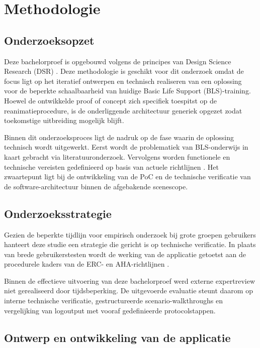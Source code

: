 \chapter{Methodologie}
\label{ch:methodologie}

\section{Onderzoeksopzet}

Deze bachelorproef is opgebouwd volgens de principes van Design Science Research (DSR) \autocite{Peffers2007,Hevner2004}. Deze methodologie is geschikt voor dit onderzoek omdat de focus ligt op het iteratief ontwerpen en technisch realiseren van een oplossing voor de beperkte schaalbaarheid van huidige Basic Life Support (BLS)-training. Hoewel de ontwikkelde proof of concept zich specifiek toespitst op de reanimatieprocedure, is de onderliggende architectuur generiek opgezet zodat toekomstige uitbreiding mogelijk blijft.

Binnen dit onderzoeksproces ligt de nadruk op de fase waarin de oplossing technisch wordt uitgewerkt. Eerst wordt de problematiek van BLS-onderwijs in kaart gebracht via literatuuronderzoek. Vervolgens worden functionele en technische vereisten gedefinieerd op basis van actuele richtlijnen \autocite{ERC2025BLS}. Het zwaartepunt ligt bij de ontwikkeling van de PoC en de technische verificatie van de software-architectuur binnen de afgebakende scenescope.

\section{Onderzoeksstrategie}

Gezien de beperkte tijdlijn voor empirisch onderzoek bij grote groepen gebruikers hanteert deze studie een strategie die gericht is op technische verificatie. In plaats van brede gebruikerstesten wordt de werking van de applicatie getoetst aan de procedurele kaders van de ERC- en AHA-richtlijnen \autocite{ERC2025BLS, AHA2025Guidelines}.

Binnen de effectieve uitvoering van deze bachelorproef werd externe expertreview niet gerealiseerd door tijdsbeperking. De uitgevoerde evaluatie steunt daarom op interne technische verificatie, gestructureerde scenario-walkthroughs en vergelijking van logoutput met vooraf gedefinieerde protocolstappen.

\section{Ontwerp en ontwikkeling van de applicatie}

